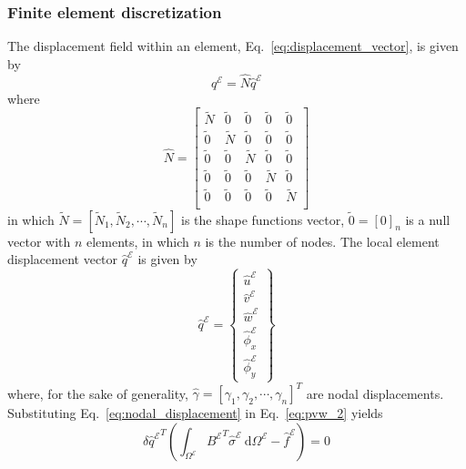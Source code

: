 \documentclass[12pt]{article}
\numberwithin{equation}{section}
\def\el{{ \mathcal{E} }}
\begin{document}
\subsubsection{Finite element discretization}
The displacement field within an element, Eq.~\eqref{eq:displacement_vector}, is given by
%
\begin{equation}
    q^\el = \hat{N} \hat{q}^\el
    \label{eq:nodal_displacement}
\end{equation}
%
where
% 
\begin{equation}
    \hat{N} =
    \begin{bmatrix}
        \tilde{N} & \tilde{0} & \tilde{0} & \tilde{0} & \tilde{0} \\
        \tilde{0} & \tilde{N} & \tilde{0} & \tilde{0} & \tilde{0} \\
        \tilde{0} & \tilde{0} & \tilde{N} & \tilde{0} & \tilde{0} \\
        \tilde{0} & \tilde{0} & \tilde{0} & \tilde{N} & \tilde{0} \\
        \tilde{0} & \tilde{0} & \tilde{0} & \tilde{0} & \tilde{N} \\
    \end{bmatrix}
\end{equation}
%
in which \(\tilde{N} = [\tilde{N}_1, \tilde{N}_2, \cdots, \tilde{N}_n]\) is the shape functions vector, \(\tilde{0} = [0]_n\) is a null vector with \(n\) elements, in which \(n\) is the number of nodes. The local element displacement vector \(\hat{q}^\el\) is given by
% 
\begin{equation}
    \hat{q}^\el =
    \begin{Bmatrix}
        \hat{u}^\el      \\
        \hat{v}^\el      \\
        \hat{w}^\el      \\
        \hat{\phi}_x^\el \\
        \hat{\phi}_y^\el
    \end{Bmatrix}
\end{equation}
%
where, for the sake of generality, \( \hat{\gamma} = [\gamma_1, \gamma_2, \cdots, \gamma_n ]^T \) are nodal displacements. Substituting Eq.~\eqref{eq:nodal_displacement} in Eq.~\eqref{eq:pvw_2} yields
%
\begin{equation}
    {\delta \hat{q}^\el}^T
    \left(
    \int_{\Omega^\el} {B^\el}^T \hat{\sigma}^\el ~ \text{d}\Omega^\el -
    \hat{f}^\el
    \right) = 0
    \label{eq:strain_energy_5}
\end{equation}
%
\end{document}
